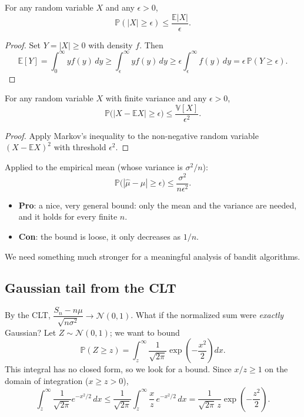 \begin{theorem}
For any random variable $X$ and any $\epsilon > 0$,
\[
\mathbb{P}(|X| \geq \epsilon) \leq \frac{\mathbb{E}|X|}{\epsilon}.
\]
\end{theorem}

\begin{proof}
Set $Y = |X| \geq 0$ with density $f$. Then
\[
\mathbb{E}[Y] = \int_0^\infty y f(y)\, dy \geq \int_\epsilon^\infty y f(y)\, dy \geq \epsilon \int_\epsilon^\infty f(y)\, dy = \epsilon\, \mathbb{P}(Y \geq \epsilon).
\]
\end{proof}

\begin{theorem}
For any random variable $X$ with finite variance and any $\epsilon > 0$,
\[
\mathbb{P}\big(|X - \mathbb{E}X| \geq \epsilon\big) \leq \frac{\mathbb{V}[X]}{\epsilon^2}.
\]
\end{theorem}

\begin{proof}
Apply Markov's inequality to the non-negative random variable $(X - \mathbb{E}X)^2$ with threshold $\epsilon^2$.
\end{proof}

Applied to the empirical mean (whose variance is $\sigma^2/n$):
\[
\mathbb{P}\big(|\hat{\mu} - \mu| \geq \epsilon\big) \leq \frac{\sigma^2}{n\epsilon^2}.
\]

\begin{itemize}
    \item \textbf{Pro}: a nice, very general bound: only the mean and the variance are needed, and it holds for every finite $n$.
    \item \textbf{Con}: the bound is loose, it only decreases as $1/n$.
\end{itemize}
We need something much stronger for a meaningful analysis of bandit algorithms.

\subsection{Gaussian tail from the CLT}

By the CLT, $\dfrac{S_n - n\mu}{\sqrt{n\sigma^2}} \to \mathcal{N}(0,1)$. What if the normalized sum were \emph{exactly} Gaussian? Let $Z \sim \mathcal{N}(0,1)$; we want to bound
\[
\mathbb{P}(Z \geq z) = \int_z^\infty \frac{1}{\sqrt{2\pi}} \exp\left(-\frac{x^2}{2}\right) dx.
\]
This integral has no closed form, so we look for a bound. Since $x/z \geq 1$ on the domain of integration ($x \geq z > 0$),
\[
\int_z^\infty \frac{1}{\sqrt{2\pi}} e^{-x^2/2}\, dx \leq \frac{1}{\sqrt{2\pi}} \int_z^\infty \frac{x}{z}\, e^{-x^2/2}\, dx = \frac{1}{\sqrt{2\pi}\, z} \exp\left(-\frac{z^2}{2}\right).
\]

